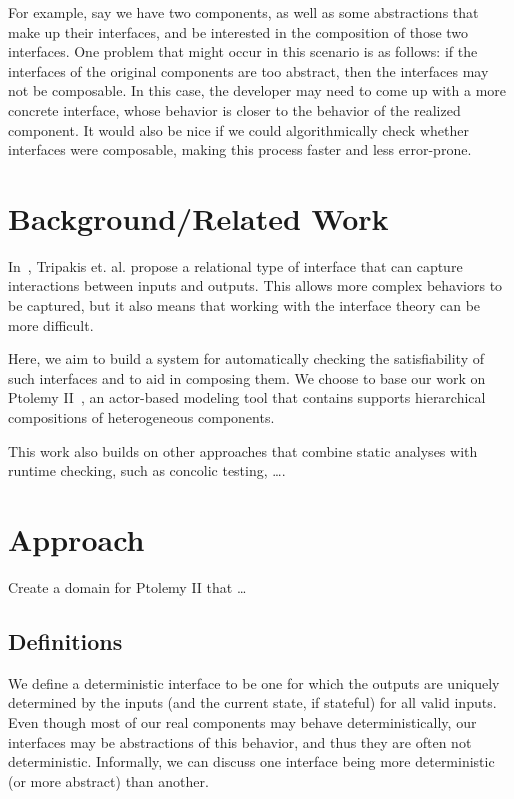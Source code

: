 \documentclass[preprint,11pt]{sigplanconf}
\begin{document}
For example, say we have two components, as well as some abstractions that
make up their interfaces, and be interested in the composition of those two
interfaces.
One problem that might occur in this scenario is as follows: if the interfaces
of the original components are too abstract, then the interfaces may not be
composable.
In this case, the developer may need to come up with a more concrete
interface, whose behavior is closer to the behavior of the realized component.
It would also be nice if we could algorithmically check whether interfaces
were composable, making this process faster and less error-prone.

\section{Background/Related Work}
In~\cite{relationalInterfaces}, Tripakis et. al. propose a relational type of
interface that can capture interactions between inputs and outputs.
This allows more complex behaviors to be captured, but it also means that
working with the interface theory can be more difficult.

Here, we aim to build a system for automatically checking the satisfiability
of such interfaces and to aid in composing them.
We choose to base our work on Ptolemy II~\cite{ptII}, an actor-based modeling
tool that contains supports hierarchical compositions of heterogeneous components.


This work also builds on other approaches that combine static analyses with
runtime checking, such as concolic testing, \dots {}.

\section{Approach}
Create a domain for Ptolemy II that \dots

\subsection{Definitions}
We define a deterministic interface to be one for which the outputs are
uniquely determined by the inputs (and the current state, if stateful) for all
valid inputs.
Even though most of our real components may behave deterministically, our
interfaces may be abstractions of this behavior, and thus they are often not
deterministic.
Informally, we can discuss one interface being more deterministic (or more
abstract) than another.
\end{document}
